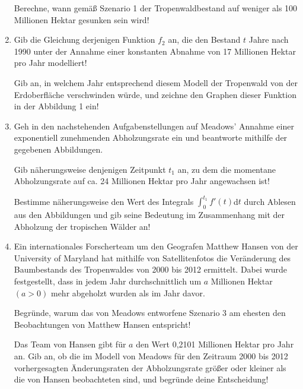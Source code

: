 \begin{langesbeispiel}
\begin{enumerate}
	Berechne, wann gemäß Szenario 1 der Tropenwaldbestand auf weniger als 100 Millionen Hektar gesunken sein wird!\leer
	
	\item Gib die Gleichung derjenigen Funktion $f_2$ an, die den Bestand $t$ Jahre nach 1990 unter der Annahme einer konstanten Abnahme von 17 Millionen Hektar pro Jahr modelliert!\leer
	
	Gib an, in welchem Jahr entsprechend diesem Modell der Tropenwald von der Erdoberfläche verschwinden würde, und zeichne den Graphen dieser Funktion in der Abbildung 1 ein!\leer
	
	\item Geh in den nachstehenden Aufgabenstellungen auf Meadows' Annahme einer exponentiell zunehmenden Abholzungsrate ein und beantworte mithilfe der gegebenen Abbildungen.\leer
	
	Gib näherungsweise denjenigen Zeitpunkt $t_1$ an, zu dem die momentane Abholzungsrate auf ca. 24 Millionen Hektar pro Jahr angewachsen ist!\leer
	
	Bestimme näherungsweise den Wert des Integrals $\int^{t_1}_0{f'(t)}$d$t$ durch Ablesen aus den Abbildungen und gib seine Bedeutung im Zusammenhang mit der Abholzung der tropischen Wälder an!\leer
	
	\item Ein internationales Forscherteam um den Geografen Matthew Hansen von der University of Maryland hat mithilfe von Satellitenfotos die Veränderung des Baumbestands des Tropenwaldes von 2000 bis 2012 ermittelt. Dabei wurde festgestellt, dass in jedem Jahr durchschnittlich um $a$ Millionen Hektar $(a>0)$ mehr abgeholzt wurden als im Jahr davor.\leer
	
 Begründe, warum das von Meadows entworfene Szenario 3 am ehesten den Beobachtungen von Matthew Hansen entspricht!\leer

 Das Team von Hansen gibt für $a$ den Wert 0,2101 Millionen Hektar pro Jahr an. Gib an, ob die im Modell von Meadows für den Zeitraum 2000 bis 2012 vorhergesagten Änderungsraten der Abholzungsrate größer oder kleiner als die von Hansen beobachteten sind, und begründe deine Entscheidung! 
\end{enumerate}

\end{langesbeispiel}
